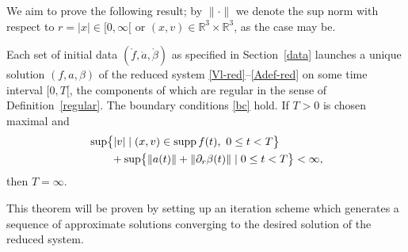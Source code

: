 \documentclass[11pt]{article}
\def\R{\mathbb R}
\def\supp{\mathrm{supp}\,}
\begin{document}
We aim to prove the following result; by $\| \cdot \|$ we denote the
sup norm with respect to $r=|x|\in [0,\infty[$ or $(x,v)\in \R^3\times\R^3$,
as the case may be.
%
\begin{theorem}\label{locex}
  Each set of initial data $(\mathring{f}, \mathring{a}, \mathring{\beta})$
  as specified in Section~\ref{data} launches a unique solution $(f,a,\beta)$
  of the reduced system \eqref{Vl-red}--\eqref{Adef-red} on some time interval
  $[0,T[$, the components of
  which are regular in the sense of Definition~\ref{regular}.
  The boundary conditions \eqref{bc} hold.    
  If $T>0$ is chosen maximal and
  \begin{align}\label{contcrit}
    &
    \sup\bigl\{|v| \mid (x,v)\in \supp f(t),\ 0\leq t < T\bigr\}\notag\\
    &\qquad{}
    + \sup\bigl\{\|a(t)\| + \|\partial_r \beta(t)\| \mid 0\leq t < T\bigr\}
    < \infty,
  \end{align}
  then $T=\infty$.
\end{theorem}
%
This theorem will be proven by setting up an iteration scheme which generates
a sequence of approximate solutions converging to the desired solution
of the reduced system.
%
\end{document}
